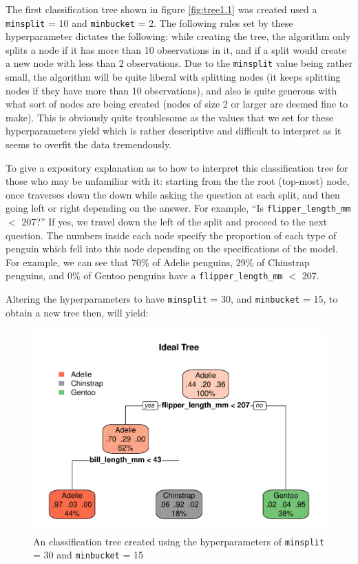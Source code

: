 \documentclass[12pt]{article}
\begin{document}
The first classification tree shown in figure \ref{fig:tree1.1} was
created used a \texttt{minsplit} = 10 and \texttt{minbucket} = 2. The
following rules set by these hyperparameter dictates the following:
while creating the tree, the algorithm only splits a node if it has more
than 10 observations in it, and if a split would create a new node with
less than 2 observations. Due to the \texttt{minsplit} value being
rather small, the algorithm will be quite liberal with splitting nodes
(it keeps splitting nodes if they have more than 10 observations), and
also is quite generous with what sort of nodes are being created (nodes
of size 2 or larger are deemed fine to make). This is obviously quite
troublesome as the values that we set for these hyperparameters yield
which is rather descriptive and difficult to interpret as it seems to
overfit the data tremendously.

To give a expository explanation as to how to interpret this
classification tree for those who may be unfamiliar with it: starting
from the the root (top-most) node, once traverses down the down while
asking the question at each split, and then going left or right
depending on the answer. For example, ``Is \texttt{flipper\_length\_mm}
\(<\) 207?'' If yes, we travel down the left of the split and proceed to
the next question. The numbers inside each node specify the proportion
of each type of penguin which fell into this node depending on the
specifications of the model. For example, we can see that 70\% of Adelie
penguins, 29\% of Chinstrap penguins, and 0\% of Gentoo penguins have a
\texttt{flipper\_length\_mm} \(<\) 207.

Altering the hyperparameters to have \texttt{minsplit} = 30, and
\texttt{minbucket} = 15, to obtain a new tree then, will yield:

\begin{figure}
\centering
\includegraphics{report_files/figure-latex/tree2.1-1.pdf}
\caption{\label{fig:tree2.1} An classification tree created using the
hyperparameters of \texttt{minsplit} = 30 and \texttt{minbucket} = 15}
\end{figure}
\end{document}
